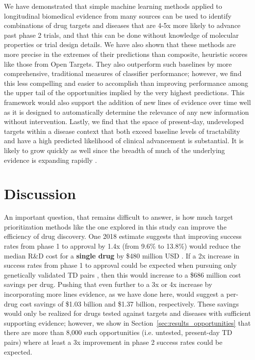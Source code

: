 \documentclass{article}
\begin{document}
We have demonstrated that simple machine learning methods applied to longitudinal biomedical evidence from many sources can be used to identify combinations of drug targets and diseases that are 4-5x more likely to advance past phase 2 trials, and that this can be done without knowledge of molecular properties or trial design details. We have also shown that these methods are more precise in the extremes of their predictions than composite, heuristic scores like those from Open Targets. They also outperform such baselines by more comprehensive, traditional measures of classifier performance; however, we find this less compelling and easier to accomplish than improving performance among the upper tail of the opportunities implied by the very highest predictions. This framework would also support the addition of new lines of evidence over time well as it is designed to automatically determine the relevance of any new information without intervention. Lastly, we find that the space of present-day, undeveloped targets within a disease context that both exceed baseline levels of tractability and have a high predicted likelihood of clinical advancement is substantial. It is likely to grow quickly as well since the breadth of much of the underlying evidence is expanding rapidly \cite{PMID:33214558,PMID:36634672,PMID:31491408}.

\section{Discussion}
\label{sec:discussion}

An important question, that remains difficult to answer, is how much target prioritization methods like the one explored in this study can improve the efficiency of drug discovery. One 2018 estimate suggests that improving success rates from phase 1 to approval by 1.4x (from 9.6\% to 13.8\%) would reduce the median R\&D cost for a \textbf{single drug} by \$480 million USD \cite{PMID:32125404}. If a 2x increase in success rates from phase 1 to approval could be expected when pursuing only genetically validated TD pairs \cite{Nelson2015-eg}, then this would increase to a \$686 million cost savings per drug. Pushing that even further to a 3x or 4x increase by incorporating more lines evidence, as we have done here, would suggest a per-drug cost savings of \$1.03 billion and \$1.37 billion, respectively. These savings would only be realized for drugs tested against targets and diseases with sufficient supporting evidence; however, we show in Section~\ref{sec:results_opportunities} that there are more than 8,000 such opportunities (i.e. untested, present-day TD pairs) where at least a 3x improvement in phase 2 success rates could be expected.
\end{document}
